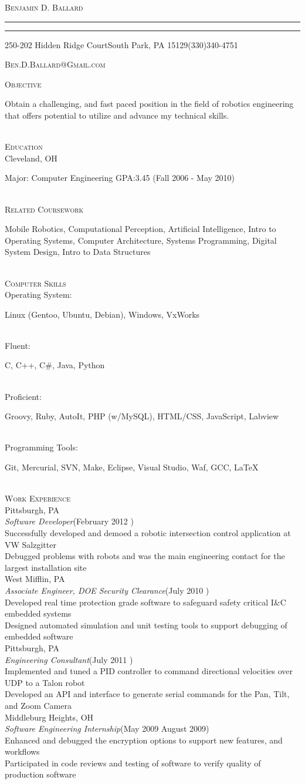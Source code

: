 \documentclass[11pt,letterpaper]{article}
\makeatletter
\newcommand{\name}{\textsc{Benjamin D. Ballard}}
\newcommand{\address}{\footnotesize 250-202 Hidden Ridge Court\hspace{2px}\textbullet\hspace{2px}South Park, PA 15129\hspace{2px}\textbullet\hspace{2px}(330)340-4751}
\newcommand{\email}{\textsc{Ben.D.Ballard@Gmail.com}}
\newcommand{\SkillItem}[2]{\hspace*{.5in}#1\hfill\begin{minipage}[t]{5.6in} #2 \end{minipage}\\}
\newcommand{\SectionHeader}[1]{\textsc{#1} \vspace{-2px}\\}
\newcommand{\CollegeHeader}[2]{\hspace*{.52in}{\bf#1} \hfill #2 \vspace{-3px} \\}
\newcommand{\CompanyHeader}[4]{\hspace*{.52in}{\bf#1} \hfill #2 \\\hspace*{.5in}\emph{#3}\hfill (#4) \vspace{-2px} \\}
\newcommand{\ResumeItem}[1]{\hspace*{.5in}\textopenbullet\hspace*{.2in}#1\\}
\newcommand{\TextBlock}[1]
{\hspace*{.5in} \begin{minipage}[t]{\textwidth -.5in} #1 \end{minipage}\\}
\newcommand{\ResumeHeader}{
\begin{center}
{

\linespread{0}

\Huge{\textsc{\name}}

\small
\nointerlineskip \vspace{4px}%
  \hspace{\fill}
\rule{\textwidth}{1px}
 \par\nointerlineskip \vspace{\baselineskip}
\nointerlineskip \vspace{0px}%
  \hspace{\fill}
\rule{\textwidth}{1px}
 \par \nointerlineskip \vspace{1px}
 \address \par \nointerlineskip \vspace{\baselineskip}
 \email
}
\end{center}
}
\makeatother
\begin{document}
\ResumeHeader
\vspace{-16px}

\SectionHeader{Objective}
\TextBlock{Obtain a challenging, and fast paced position in the field of robotics engineering that offers potential to utilize and advance my technical skills.}
\SectionHeader{Education}
\CollegeHeader{Case Western Reserve University}{Cleveland, OH}
\TextBlock{Major: Computer Engineering GPA:3.45 \hfill (Fall 2006 - May 2010)}
\SectionHeader{Related Coursework}
\TextBlock{Mobile Robotics, Computational Perception, Artificial Intelligence, Intro to Operating Systems, Computer Architecture, Systems Programming, Digital System Design, Intro to Data Structures}
\SectionHeader{Computer Skills}
\SkillItem{Operating System:}{Linux (Gentoo, Ubuntu, Debian), Windows, VxWorks}
\SkillItem{Fluent:}{C, C++, C\#, Java, Python}
\SkillItem{Proficient:}{Groovy, Ruby, AutoIt, PHP (w/MySQL), HTML/CSS, JavaScript, Labview}
\SkillItem{Programming Tools:}{Git, Mercurial, SVN, Make, Eclipse, Visual Studio, Waf, GCC, \LaTeX}
\SectionHeader{Work Experience}
\CompanyHeader{Seegrid}{Pittsburgh, PA}{Software Developer}{February 2012  \textendash { Present}}
\ResumeItem{Successfully developed and demoed a robotic intersection control application at VW Salzgitter }
\ResumeItem{Debugged problems with robots and was the main engineering contact for the largest installation site}
\CompanyHeader{Bechtel Marine Propulsion Company (Bettis Atomic Power Laboratory)}{West Mifflin, PA}{Associate Engineer, DOE Security Clearance}{July 2010 \textendash { February 2012}}
\ResumeItem{Developed real time protection grade software to safeguard safety critical I\&{C} embedded systems}
\ResumeItem{Designed automated simulation and unit testing tools to support debugging of embedded software}
\CompanyHeader{Carnegie Robotics}{Pittsburgh, PA}{Engineering Consultant}{July 2011 \textendash { August 2011}}
\ResumeItem{Implemented and tuned a PID controller to command directional velocities over UDP to a Talon robot}
\ResumeItem{Developed an API and interface to generate serial commands for the Pan, Tilt, and Zoom Camera}
\CompanyHeader{Codonics}{Middleburg Heights, OH}{Software Engineering Internship}{May 2009 \textendash
 { }August 2009}
 \ResumeItem{Enhanced and debugged the encryption options to support new features, and workflows}
 \ResumeItem{Participated in code reviews and testing of software to verify quality of production software}
\end{document}
